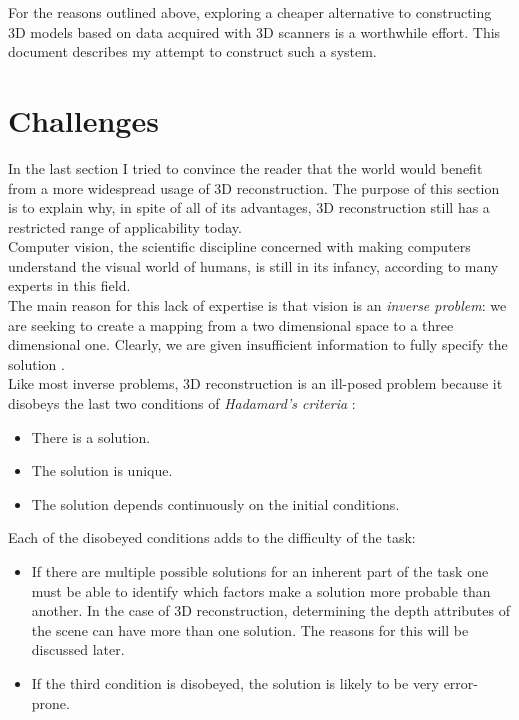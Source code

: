 \documentclass[12pt,a4paper,twoside,openright]{report}
\begin{document}
For the reasons outlined above, exploring a cheaper alternative to constructing 3D models based on data acquired with 3D scanners is a worthwhile effort. This document describes my attempt to construct such a system. 

\section{Challenges}
In the last section I tried to convince the reader that the world would benefit from a more widespread usage of 3D reconstruction. The purpose of this section is to explain why, in spite of all of its advantages, 3D reconstruction still has a restricted range of applicability today. \\
\linebreak
Computer vision, the scientific discipline concerned with making computers understand the visual world of humans, is still in its infancy, according to many experts in this field. \\
The main reason for this lack of expertise is that vision is an \textit{inverse problem}: we are seeking to create a mapping from a two dimensional space to a three dimensional one. Clearly, we are given insufficient information to fully specify the solution \cite{Szeliski+2011}.\\
\linebreak
Like most inverse problems, 3D reconstruction is an ill-posed problem because it disobeys the last two conditions of \textit{Hadamard's criteria} \cite{+2008}:
\begin{itemize}
\item There is a solution.
\item The solution is unique.
\item The solution depends continuously on the initial conditions.
\end{itemize}
Each of the disobeyed conditions adds to the difficulty of the task:\\
\begin{itemize}
\item If there are multiple possible solutions for an inherent part of the task one must be able to identify which factors make a solution more probable than another. In the case of 3D reconstruction, determining the depth attributes of the scene can have more than one solution. The reasons for this will be discussed later.
\item If the third condition is disobeyed, the solution is likely to be very error-prone.
\end{itemize}
\end{document}
